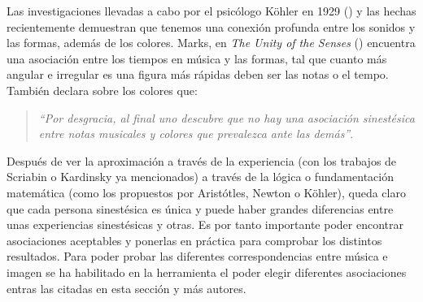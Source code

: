 Las investigaciones llevadas a cabo por el psicólogo Köhler en 1929 (\cite{GestaltPsychology}) y las hechas recientemente demuestran que tenemos una conexión profunda entre los sonidos y las formas, además de los colores. Marks, en \emph{The Unity of the Senses} (\cite{TheUnityOfTheSenses}) encuentra una asociación entre los tiempos en música y las formas, tal que cuanto más angular e irregular es una figura \color{blue} más rápidas deben ser las notas o el tempo. \color{black} También declara sobre los colores que:
\begin{quote}
\emph{``Por desgracia, al final uno descubre que no hay una asociación sinestésica entre notas musicales y colores que prevalezca ante las demás''}.\\
\end{quote}

\color{blue} 
Después de ver la aproximación a través de la experiencia (con los trabajos de Scriabin o Kardinsky ya mencionados) a través de la lógica o fundamentación matemática (como los propuestos por Aristótles, Newton o Köhler), queda claro que cada persona sinestésica es única y puede haber grandes diferencias entre unas experiencias sinestésicas y otras. Es por tanto importante poder encontrar asociaciones aceptables y ponerlas en práctica para comprobar los distintos resultados. Para poder probar las diferentes correspondencias entre música e imagen se ha habilitado en la herramienta el poder elegir diferentes asociaciones entras las citadas en esta sección y más autores. \color{black}